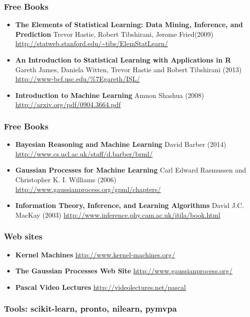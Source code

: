 \begin{frame}
\frametitle{Free Books}
\begin{itemize}
\item {\bf The Elements of Statistical Learning: Data Mining, Inference, and Prediction}
      Trevor Hastie, Robert Tibshirani, Jerome Fried(2009)
      \url{http://statweb.stanford.edu/~tibs/ElemStatLearn/}
\item {\bf An Introduction to Statistical Learning with Applications in R}
      Gareth James, Daniela Witten, Trevor Hastie and Robert Tibshirani (2013)
      \url{http://www-bcf.usc.edu/\%7Egareth/ISL/}
\item {\bf Introduction to Machine Learning}
      Amnon Shashua (2008)
      \url{http://arxiv.org/pdf/0904.3664.pdf}
\end{itemize}
\end{frame}

\begin{frame}
\frametitle{Free Books}
\begin{itemize}
\item {\bf Bayesian Reasoning and Machine Learning}
      David Barber (2014)
      \url{http://www.cs.ucl.ac.uk/staff/d.barber/brml/}
\item {\bf Gaussian Processes for Machine Learning}
      Carl Edward Rasmussen and Christopher K. I. Williams (2006)
      \url{http://www.gaussianprocess.org/gpml/chapters/}
\item {\bf Information Theory, Inference, and Learning Algorithms}
      David J.C. MacKay (2003)
      \url{http://www.inference.phy.cam.ac.uk/itila/book.html}
\end{itemize}
\end{frame}

\begin{frame}
\frametitle{Web sites}
\begin{itemize}
\item {\bf Kernel Machines} \url{http://www.kernel-machines.org/}
\item {\bf The Gaussian Processes Web Site} \url{http://www.gaussianprocess.org/}
\item {\bf Pascal Video Lectures}  \url{http://videolectures.net/pascal}
\end{itemize}
\end{frame}

\begin{frame}
\frametitle{Tools: scikit-learn, pronto, nilearn, pymvpa}
\end{frame}


